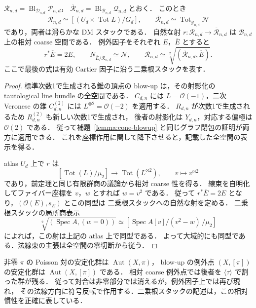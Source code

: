 \begin{theorem}
\label{thm:resolution-root-stack}
$\mathcal R_{n,d}=\operatorname{Bl}_{\mathcal D_{n,d}}\mathcal P_{n,d}$，
$\overline{\mathcal R}_{n,d}=\operatorname{Bl}_{\mathcal B_{n,d}}\mathcal Q_{n,d}$ とおく．
このとき
\[
 \mathcal R_{n,d}\simeq[(U_d\times\operatorname{Tot}L)/G_d],\qquad
 \overline{\mathcal R}_{n,d}\simeq
 \operatorname{Tot}_{\overline{\mathcal Y}_{n,d}}\mathcal N
\]
であり，両者は滑らかな DM スタックである．
自然な射 $r:\mathcal R_{n,d}\to\overline{\mathcal R}_{n,d}$ は
$\mathcal B_{n,d}$ 上の相対 coarse 空間である．
例外因子をそれぞれ $E$，$\overline E$ とすると
\[
 r^*\overline E=2E,\qquad
 N_{\overline E/\overline{\mathcal R}_{n,d}}\simeq\mathcal N,
 \qquad
 \mathcal R_{n,d}\simeq
 \sqrt[2]{(\overline{\mathcal R}_{n,d},\overline E)}.
\]
ここで最後の式は有効 Cartier 因子に沿う二乗根スタックを表す．
\end{theorem}
\begin{proof}
標準次数1で生成される錐の頂点の blow-up は，その射影化の
tautological line bundle の全空間である．
$C_{d,n}$ には $L=\mathcal O(-1)$，二次 Veronese の錐 $C_{d,n}^{(2)}$ には
$L^{\otimes2}=\mathcal O(-2)$ を適用する．
$R_{d,n}$ が次数1で生成されるため $R_{d,n}^{(2)}$ も新しい次数1で生成され，
後者の射影化は $Y_{d,n}$，対応する偏極は $\mathcal O(2)$ である．
従って補題~\ref{lemma:cone-blowup} と同じグラフ閉包の証明が両方に適用できる．
これを座標作用に関して降下させると，記載した全空間の表示を得る．

atlas $U_d$ 上で $r$ は
\[
 [\operatorname{Tot}(L)/\mu_2]\longrightarrow\operatorname{Tot}(L^{\otimes2}),
 \qquad v\longmapsto v^{\otimes2}
\]
であり，前定理と同じ有限群商の議論から相対 coarse 性を得る．
線束を自明化してファイバー座標を $v$，$w$ とすれば $w=v^2$ である．
従って $r^*\overline E=2E$ となり，$(\mathcal O(E),s_E)$ とこの同型は
二乗根スタックへの自然な射を定める．
二乗根スタックの局所商表示
\[
 \sqrt[2]{(\operatorname{Spec}A,(w=0))}
 \simeq[\operatorname{Spec}A[v]/(v^2-w)\,/\mu_2]
\]
\cite[\S2.2, \S2.3]{Cadman2007} によれば，この射は上記の atlas 上で同型である．
よって大域的にも同型である．法線束の主張は全空間の零切断から従う．
\end{proof}

\begin{remark}[慣性の所在]
非零 $\pi$ の Poisson 対の安定化群は $\operatorname{Aut}(X,\pi)$，
blow-up の例外点 $(X,[\pi])$ の安定化群は $\operatorname{Aut}(X,[\pi])$ である．
相対 coarse 例外点では後者を $\langle\tau\rangle$ で割った群が残る．
従って対合は非零部分では消えるが，例外因子上では再び現れ，
その法線方向に符号反転で作用する．二乗根スタックの記述は，この相対慣性を正確に表している．
\end{remark}
